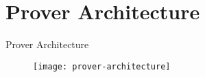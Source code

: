 
\section{Prover Architecture}
\begin{frame}{Prover Architecture}
\begin{figure}
\texttt{[image: prover-architecture]}
\end{figure}
\end{frame}